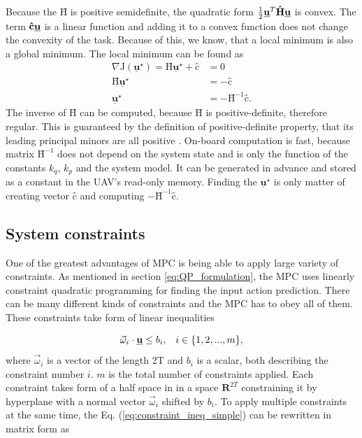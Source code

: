\documentclass[a4paper,11pt,titlepage]{article}
\newcommand{\uvec}{\textbf{\underline{u}}}
\newcommand{\macoi}{\vec{\omega}_i}
\begin{document}
Because the  $\textbf{\^H}$ is positive semidefinite, the quadratic form $\frac{1}{2}\uvec^T\textbf{\^H}\uvec$ is convex. The term $\textbf{\^c} \uvec$ is a linear function and adding it to a convex function does not change the convexity of the task. Because of this, we know, that a local minimum is also a global minimum. The local minimum can be found as 
\begin{equation}
\label{eq:J_local_min}
\begin{split}
\nabla\mathrm{J}(\underline{\textbf{u}}^{\star}) = \textbf{\^H}\underline{\textbf{u}}^{\star} + \textbf{\^c} &= 0 \\
\textbf{\^H}\underline{\textbf{u}}^{\star} &= - \textbf{\^c} \\
\underline{\textbf{u}}^{\star} &= -\textbf{\^H}^{-1}\textbf{\^c}.
\end{split}
\end{equation}
The inverse of $\textbf{\^H}$ can be computed, because $\textbf{\^H}$ is positive-definite, therefore regular. This is guaranteed by the definition of positive-definite property, that its leading principal minors are all positive \cite{chong2013introduction}. On-board computation is fast, because matrix $\textbf{\^H}^{-1}$ does not depend on the system state and is only the function of the constants $k_q$, $k_p$ and the system model. It can be generated in advance and stored as a constant in the UAV's read-only memory. Finding the $\underline{\textbf{u}}^{\star}$ is only matter of creating vector $\textbf{\^c}$ and computing $-\textbf{\^H}^{-1}\textbf{\^c}$.


\subsection{System constraints} \label{sec:system_constraints}
One of the greatest advantages of MPC is being able to apply large variety of constraints. As mentioned in section \ref{eq:QP_formulation}, the MPC uses linearly constraint quadratic programming for finding the input action prediction. There can be many different kinds of constraints and the MPC has to obey all of them. These constraints take form of linear inequalities

\begin{equation}
\label{eq:constraint_ineq_simple}
\macoi \cdot \uvec \leq b_i, \;\;\; i \in \{1, 2, ..., m\},
\end{equation}
where $\vec{\omega}_i$ is a vector of the length 2T and $b_i$ is a scalar, both describing the constraint number $i$. $m$ is the total number of constraints applied. Each constraint takes form of a half space in in a space $\textbf{R}^{2T}$ constraining it by hyperplane with a normal vector $\vec{\omega}_i$ shifted by $b_i$. To apply multiple constraints at the same time, the Eq. (\ref{eq:constraint_ineq_simple}) can be rewritten in matrix form as 
\end{document}
